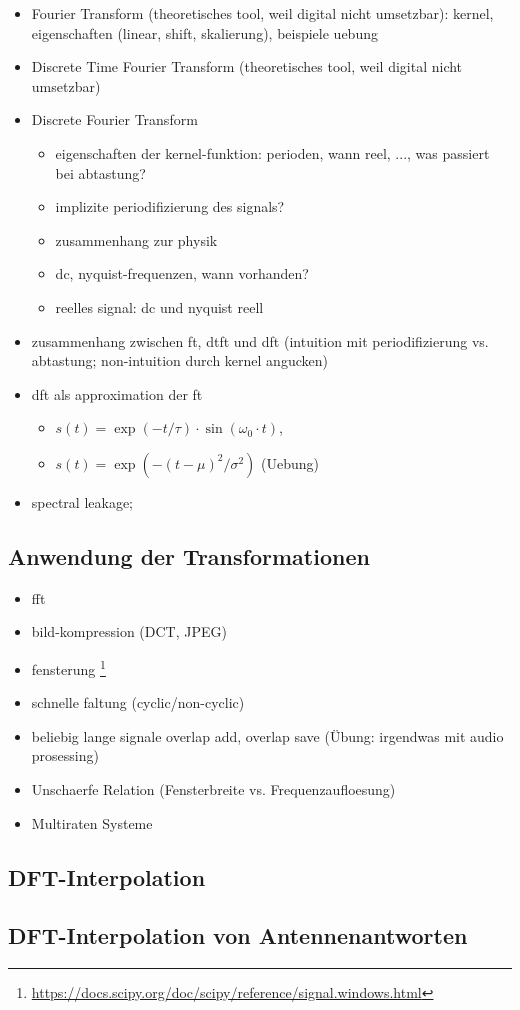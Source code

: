 \begin{itemize}
    \item Fourier Transform (theoretisches tool, weil digital nicht umsetzbar): kernel, eigenschaften (linear, shift, skalierung), beispiele uebung 
    \item Discrete Time Fourier Transform (theoretisches tool, weil digital nicht umsetzbar)
    \item Discrete Fourier Transform
    \begin{itemize}
        \item eigenschaften der kernel-funktion: perioden, wann reel, ..., was passiert bei abtastung?
        \item implizite periodifizierung des signals?
        \item zusammenhang zur physik
        \item dc, nyquist-frequenzen, wann vorhanden?
        \item reelles signal: dc und nyquist reell
    \end{itemize}
    \item zusammenhang zwischen ft, dtft und dft (intuition mit periodifizierung vs. abtastung; non-intuition durch kernel angucken)
    \item dft als approximation der ft
    \begin{itemize}
        \item $s(t) = \exp(-t/\tau) \cdot \sin(\omega_0 \cdot t)$, 
        \item $s(t) = \exp(-(t - \mu)^2/\sigma^2)$ (Uebung)
    \end{itemize}
    \item spectral leakage;
\end{itemize}
\subsection{Anwendung der Transformationen}
\begin{itemize}
    \item fft
    \item bild-kompression (DCT, JPEG)
    \item fensterung \footnote{\url{https://docs.scipy.org/doc/scipy/reference/signal.windows.html}}
    \item schnelle faltung (cyclic/non-cyclic)
    \item beliebig lange signale overlap add, overlap save (\"Ubung: irgendwas mit audio prosessing)
    \item Unschaerfe Relation (Fensterbreite vs. Frequenzaufloesung)\cite[chpt. 4.2]{mallat2008wavelets}
    \item Multiraten Systeme
\end{itemize}
%
%
\subsection{DFT-Interpolation}\label{dftintp}
%

%
%
\subsection{DFT-Interpolation von Antennenantworten}\label{eadf}
%
